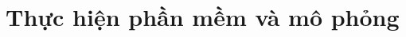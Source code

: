 \documentclass[12pt,a4paper,oneside]{book}
\begin{document}

\chapter{Thực hiện phần mềm và mô phỏng}


\end{document}
